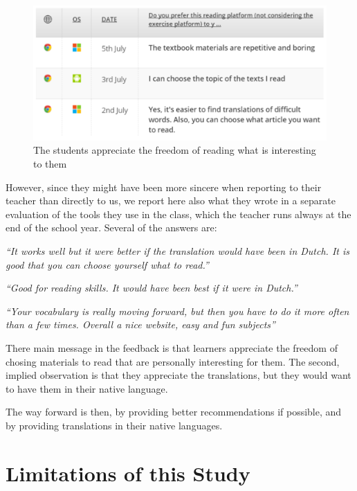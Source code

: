     \begin{figure}[h!]
    \centering
      \includegraphics[width=0.9\columnwidth]{figures/opinion_on_reading_platform}
      \caption{The students appreciate the freedom of reading what is interesting to them }
    \end{figure}

However, since they might have been more sincere when reporting to their teacher than directly to us, we report here also what they wrote in a separate evaluation of the tools they use in the class, which the teacher runs always at the end of the school year. Several of the answers are: 

\begin{description}
  \item {\em ``It works well but it were better if the translation would have been in Dutch. It is good that you can choose yourself what to read.''}
  \item {\em ``Good for reading skills. It would have been best if it were in Dutch.''}
  \item {\em ``Your vocabulary is really moving forward, but then you have to do it more often than a few times. Overall a nice website, easy and fun subjects''}
\end{description}

There main message in the feedback is that learners appreciate the freedom of chosing materials to read that are personally interesting for them. The second, implied observation is that they appreciate the translations, but they would want to have them in their native language. 

The way forward is then, by providing better recommendations if possible, and by providing translations in their native languages.



\section{Limitations of this Study}

